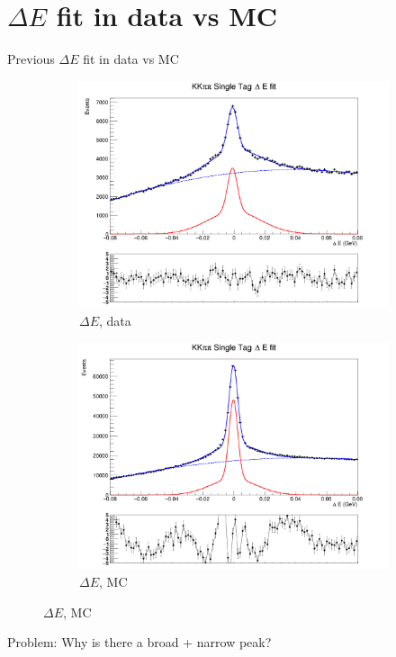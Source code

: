 \documentclass{beamer}
\begin{document}
\section{$\Delta E$ fit in data vs MC}
\begin{frame}{Previous $\Delta E$ fit in data vs MC}
  \begin{figure}
    \centering
    \begin{subfigure}{0.5\textwidth}
      \centering
      \includegraphics[width=\textwidth]{KKpipiSingleTagDeltaEPlotDataOld.png}
      \caption{$\Delta E$, data}
    \end{subfigure}%
    \begin{subfigure}{0.5\textwidth}
      \centering
      \includegraphics[width=\textwidth]{KKpipiSingleTagDeltaEPlotMCOld.png}
      \caption{$\Delta E$, MC}
    \end{subfigure}
  \end{figure}
  Problem: Why is there a broad + narrow peak?
\end{frame}
\end{document}
